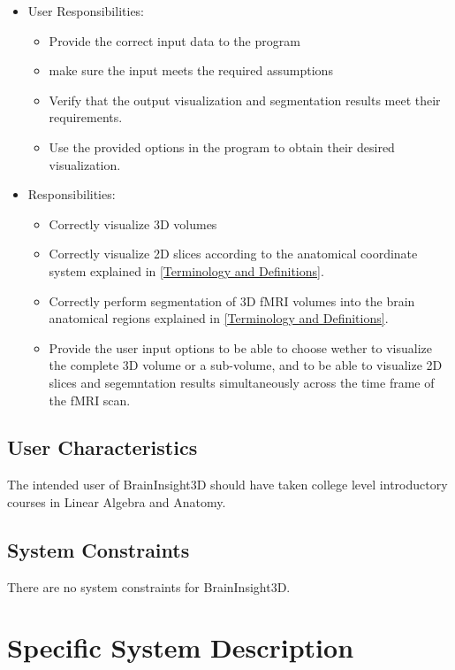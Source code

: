 \documentclass[12pt]{article}
\begin{document}
\begin{itemize}
  \item User Responsibilities:
        \begin{itemize}
          \item Provide the correct input data to the program
          \item make sure the input meets the required assumptions
          \item Verify that the output visualization and segmentation
                results meet their requirements.
          \item Use the provided options in the program to obtain their
                desired visualization.
        \end{itemize}
  \item \progname{} Responsibilities:
        \begin{itemize}
          \item Correctly visualize 3D volumes
          \item Correctly visualize 2D slices according to the anatomical
                coordinate system explained in \ref{Terminology and  Definitions}.
          \item Correctly perform segmentation of 3D fMRI volumes into the brain
                anatomical regions  explained in \ref{Terminology and  Definitions}.
          \item Provide the user input options to be able to choose wether to visualize
                the complete 3D volume or a sub-volume, and to be able to visualize 2D slices and
                segemntation results simultaneously across the time frame of the fMRI scan.
        \end{itemize}
\end{itemize}

\subsection{User Characteristics} \label{SecUserCharacteristics}

The intended user of BrainInsight3D should have taken college level introductory
courses in Linear Algebra and Anatomy.

\subsection{System Constraints}
There are no system constraints for BrainInsight3D.

\section{Specific System Description}
\end{document}
